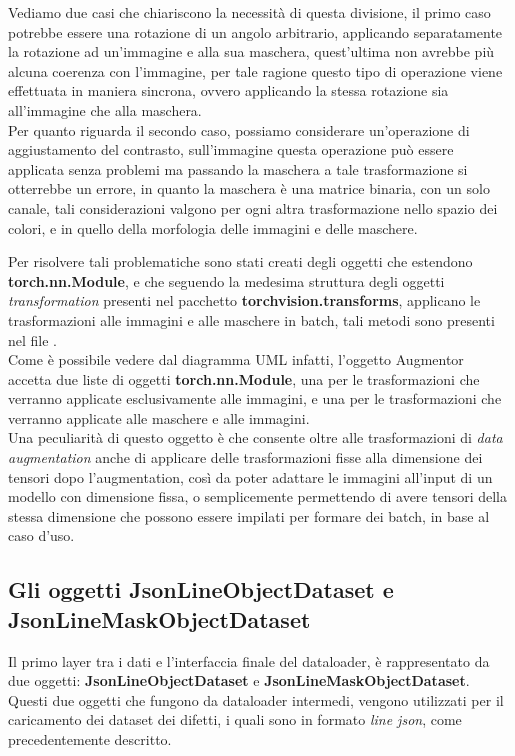 Vediamo due casi che chiariscono la necessità di questa divisione, il primo caso potrebbe essere una rotazione di un angolo arbitrario,
applicando separatamente la rotazione ad un'immagine e alla sua maschera, quest'ultima non avrebbe più alcuna coerenza con l'immagine,
per tale ragione questo tipo di operazione viene effettuata in maniera sincrona, ovvero applicando la stessa rotazione sia all'immagine che alla maschera.\\
Per quanto riguarda il secondo caso, possiamo considerare un'operazione di aggiustamento del contrasto, sull'immagine questa operazione può essere
applicata senza problemi ma passando la maschera a tale trasformazione si otterrebbe un errore, in quanto la maschera è una matrice binaria, con un solo canale,
tali considerazioni valgono per ogni altra trasformazione nello spazio dei colori, e in quello della morfologia delle immagini e delle maschere.

Per risolvere tali problematiche sono stati creati degli oggetti che estendono \textbf{torch.nn.Module}, e che seguendo la medesima struttura degli oggetti
\textit{transformation} presenti nel pacchetto \textbf{torchvision.transforms}, applicano le trasformazioni alle immagini e alle maschere in batch, tali metodi
sono presenti nel file .\\
Come è possibile vedere dal diagramma UML infatti, l'oggetto Augmentor accetta due liste di oggetti \textbf{torch.nn.Module}, una per le trasformazioni
che verranno applicate esclusivamente alle immagini, e una per le trasformazioni che verranno applicate alle maschere e alle immagini.\\

Una peculiarità di questo oggetto è che consente oltre alle trasformazioni di \textit{data augmentation} anche di applicare delle trasformazioni
fisse alla dimensione dei tensori dopo l'augmentation, così da poter adattare le immagini all'input di un modello con dimensione fissa, o semplicemente
permettendo di avere tensori della stessa dimensione che possono essere impilati per formare dei batch, in base al caso d'uso.



\subsection{Gli oggetti JsonLineObjectDataset e JsonLineMaskObjectDataset}
Il primo layer tra i dati e l'interfaccia finale del dataloader, è rappresentato da due oggetti: \textbf{JsonLineObjectDataset} e \textbf{JsonLineMaskObjectDataset}.
Questi due oggetti che fungono da dataloader intermedi, vengono utilizzati per il caricamento dei dataset dei difetti, 
i quali sono in formato \textit{line json}, come precedentemente descritto.

